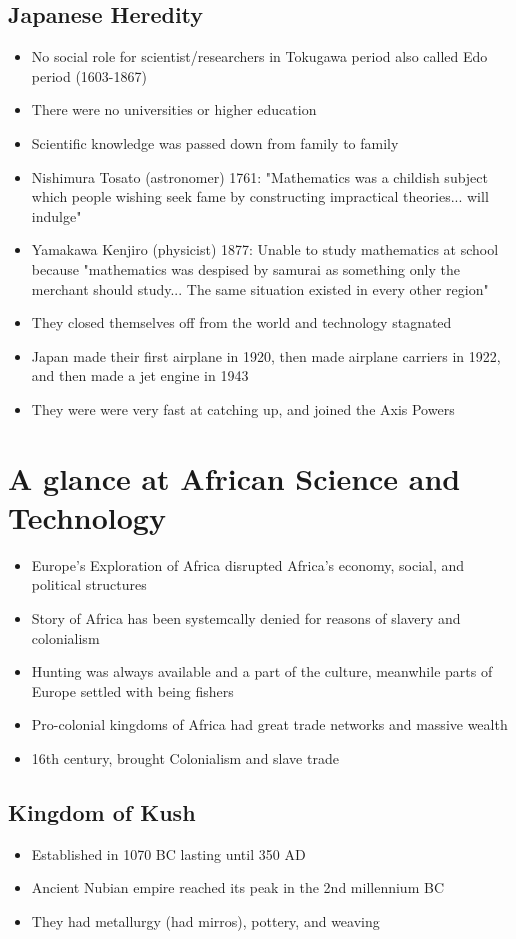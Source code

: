 \documentclass{article}
\begin{document}
\subsection{Japanese Heredity}
\begin{itemize}
  \item No social role for scientist/researchers in Tokugawa
    period also called Edo period (1603-1867)
  \item There were no universities or higher education
  \item Scientific knowledge was passed down from family to family
\item Nishimura Tosato (astronomer) 1761: "Mathematics was a childish subject
  which people wishing seek fame by constructing impractical theories... will indulge"
\item Yamakawa Kenjiro (physicist) 1877: Unable to study mathematics at school
  because "mathematics was despised by samurai as something
  only the merchant should study... The same situation existed in every other region"
\item They closed themselves off from the world and technology stagnated
\item Japan made their first airplane in 1920, then made airplane carriers
  in 1922, and then made a jet engine in 1943
\item They were were very fast at catching up, and joined
  the Axis Powers
\end{itemize}

\section{A glance at African Science and Technology}
\begin{itemize}
  \item Europe's Exploration of Africa disrupted Africa's economy, social, and
    political structures
  \item Story of Africa has been systemcally denied for reasons of slavery and colonialism
  \item Hunting was always available and a part of the culture,
    meanwhile parts of Europe settled with being fishers
  \item Pro-colonial kingdoms of Africa had great trade networks and
    massive wealth
  \item 16th century, brought Colonialism and slave trade
\end{itemize}

\subsection{Kingdom of Kush}
\begin{itemize}
  \item Established in 1070 BC lasting until 350 AD
  \item Ancient Nubian empire reached its peak in the 2nd millennium BC
  \item They had metallurgy (had mirros), pottery, and weaving
\end{itemize}
\end{document}
